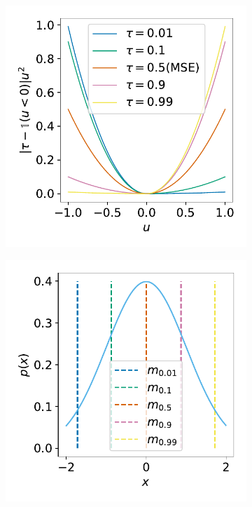 \begin{figure}
\centering
\begin{subfigure}[t]{0.32\textwidth}
    \centering
    \includegraphics[width=\textwidth]{iql/images/expectile_loss.pdf}
\end{subfigure}
\begin{subfigure}[t]{0.32\textwidth}
    \centering
    \includegraphics[width=\textwidth]{iql/images/expectile_normal.pdf}

\end{subfigure}
\end{figure}
